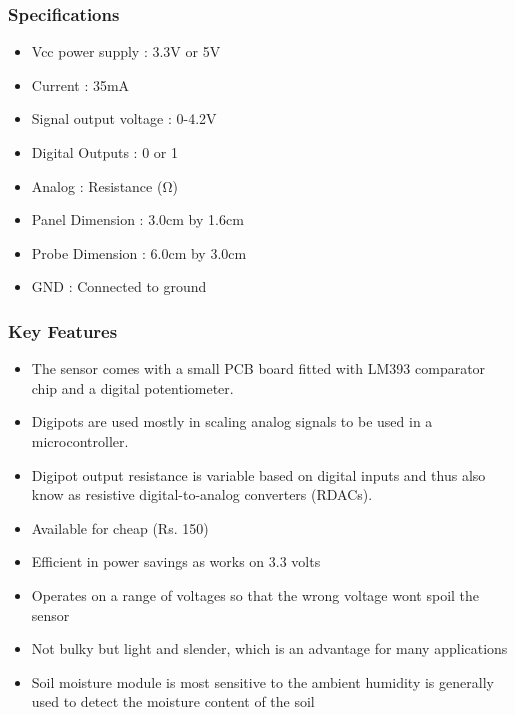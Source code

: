 \documentclass[16pt]{article}
\begin{document}
\vspace{0.5cm}

\subsubsection{Specifications}

\begin{itemize}

\item
  Vcc power supply : 3.3V or 5V
\item
  Current : 35mA
\item
  Signal output voltage : 0-4.2V
\item
  Digital Outputs : 0 or 1
\item
  Analog : Resistance (Ω)
\item
  Panel Dimension : 3.0cm by 1.6cm
\item
  Probe Dimension : 6.0cm by 3.0cm
\item
  GND : Connected to ground
\end{itemize}

\vspace{0.5cm}
\subsubsection{Key Features}

\begin{itemize}

\item
  The sensor comes with a small PCB board fitted with LM393 comparator
  chip and a digital potentiometer.
\item
  Digipots are used mostly in scaling analog signals to be used in a
  microcontroller.
\item
  Digipot output resistance is variable based on digital inputs and thus
  also know as resistive digital-to-analog converters (RDACs).
\item
  Available for cheap (Rs. 150)
\item
  Efficient in power savings as works on 3.3 volts
\item
  Operates on a range of voltages so that the wrong voltage wont spoil
  the sensor
\item
  Not bulky but light and slender, which is an advantage for many
  applications
\item
  Soil moisture module is most sensitive to the ambient humidity is
  generally used to detect the \vspace{0.5cm}moisture content of the soil
\end{itemize}
\end{document}
